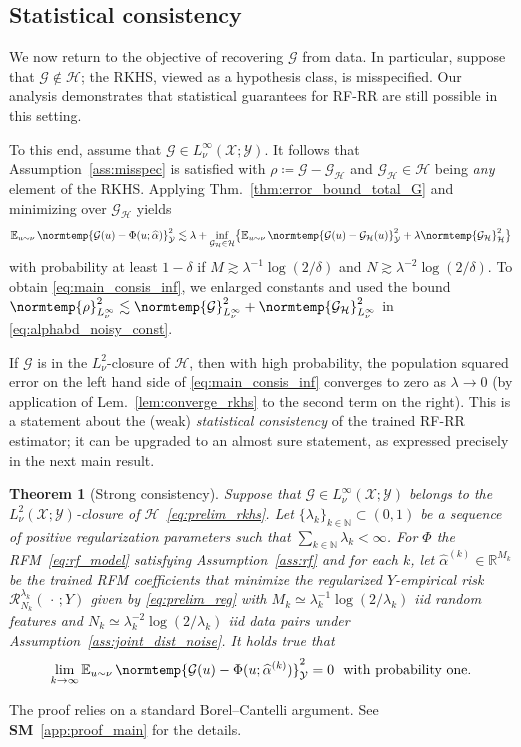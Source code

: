 \documentclass{article}
\theoremstyle{plain}
\newtheorem{theorem}{Theorem}[section]
\theoremstyle{my_def}
\theoremstyle{my_rem}
\numberwithin{equation}{section}
\numberwithin{theorem}{section}%
\newcommand{\R}{\mathbb{R}}
\newcommand{\E}{\mathbb{E}}
\newcommand{\N}{\mathbb{N}}
\newcommand{\scrR}{\mathscr{R}}
\newcommand{\cG}{\mathcal{G}}
\newcommand{\cH}{\mathcal{H}}
\newcommand{\cX}{\mathcal{X}}
\newcommand{\cY}{\mathcal{Y}}
\newcommand{\norm}{\normtemp}
\renewcommand{\hat}{\widehat}
\newcommand{\slot}{{\,\cdot\,}}
\newcommand{\defeq}{\coloneqq} %
\renewcommand{\E}{\operatorname{\mathbb{E}}} %
\newcommand{\al}{\alpha}
\newcommand{\GH}{\cG_{\cH}}
\newcommand{\alhat}{\hat{\al}}
\begin{document}
\subsection{Statistical consistency}\label{sec:main_consis}
We now return to the objective of recovering $\cG$ from data. In particular, suppose that $\cG\not\in\cH$; the RKHS, viewed as a hypothesis class, is misspecified. Our analysis demonstrates that statistical guarantees for RF-RR are still possible in this setting.

To this end, assume that $\cG\in L^\infty_\nu(\cX;\cY)$. It follows that Assumption~\ref{ass:misspec} is satisfied with $\rho\defeq \cG-\GH$ and $\GH\in\cH$ being \emph{any} element of the RKHS. Applying Thm.~\ref{thm:error_bound_total_G} and minimizing over $\GH$ yields
\begin{equation}\label{eq:main_consis_inf}
    \E_{u\sim\nu}\norm{\cG(u)-\Phi(u;\alhat)}_{\cY}^2\lesssim \lambda + \inf_{\GH\in\cH}\bigl\{\E_{u\sim\nu}\norm{\cG(u)-\GH(u)}^2_\cY + \lambda\norm{\GH}_\cH^2\bigr\}
\end{equation}
with probability at least $1-\delta$ if $M\gtrsim \lambda^{-1}\log(2/\delta)$ and $N\gtrsim \lambda^{-2}\log(2/\delta)$. To obtain \eqref{eq:main_consis_inf}, we enlarged constants and used the bound $\norm{\rho}_{L^\infty_\nu}^2\lesssim \norm{\cG}_{L^\infty_\nu}^2 + \norm{\GH}_{L^\infty_\nu}^2$ in \eqref{eq:alphabd_noisy_const}. 

If $\cG$ is in the $L^2_\nu$-closure of $\cH$, then with high probability, the population squared error on the left hand side of \eqref{eq:main_consis_inf} converges to zero as $\lambda\to 0$ (by application of Lem.~\ref{lem:converge_rkhs} to the second term on the right). This is a statement about the (weak) \emph{statistical consistency} of the trained RF-RR estimator; it can be upgraded to an almost sure statement, as expressed precisely in the next main result.

\begin{theorem}[Strong consistency]
\label{thm:main_consis_strong}
Suppose that $\cG\in L^\infty_\nu(\cX;\cY)$ belongs to the $L^2_\nu(\cX;\cY)$-closure of $\cH$~\eqref{eq:prelim_rkhs}. Let $\{\lambda_k\}_{k\in\N}\subset (0,1)$ be a sequence of positive regularization parameters such that $\sum_{k\in \N} \lambda_k < \infty$. For $\Phi$ the RFM~\eqref{eq:rf_model} satisfying Assumption~\ref{ass:rf} and for each $k$, let $\alhat^{(k)}\in\R^{M_k}$ be the trained RFM coefficients that minimize the regularized $Y$-empirical risk $\scrR_{N_k}^{\lambda_k}(\slot;Y)$ given by \eqref{eq:prelim_reg} with $M_k\simeq \lambda_k^{-1} \log(2/\lambda_k)$ iid random features and $N_k \simeq \lambda_k^{-2} \log(2/\lambda_k)$ iid data pairs under Assumption~\ref{ass:joint_dist_noise}. It holds true that
\begin{equation}\label{eq:main_consis_strong}
    \lim_{k\to \infty} \E_{u\sim\nu}\norm{\cG(u)-\Phi(u;\alhat^{(k)})}_{\cY}^2 = 0\ \ \text{with probability one.}
\end{equation}
\end{theorem}
The proof relies on a standard Borel--Cantelli argument. See {\bf SM}~\ref{app:proof_main} for the details.
\end{document}
